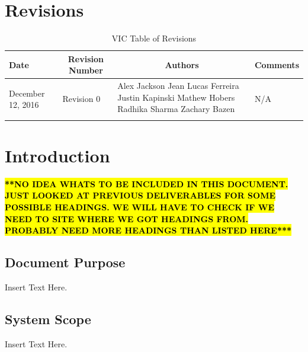 \documentclass [11pt]{article}
\begin{document}
\section{Revisions}
\begin{longtable}{| p{ } | p{ } | p{ } | p{ } |}

\hline 
\centering \textbf{Date} & 
\multicolumn{1}{c}{\textbf {Revision Number}} &
\multicolumn{1}{|c}{\textbf {Authors}} & 
\multicolumn{1}{|c|}{\textbf {Comments}} \\ \hline

\multirow{4}{*}{\centering December 12, 2016}  & 
\multirow{4}{*}{Revision 0}& 
{Alex Jackson \newline
Jean Lucas Ferreira \newline
Justin Kapinski\newline
Mathew Hobers\newline
Radhika Sharma\newline
Zachary Bazen}
&
 \multirow{4}{*}{N/A} \\ 
\hline 

\caption{VIC Table of Revisions} 
\end{longtable}
\pagebreak


\section {Introduction}
\begin{center}
	\hl{\textbf{\large***NO IDEA WHATS TO BE INCLUDED IN THIS DOCUMENT. JUST LOOKED AT PREVIOUS DELIVERABLES FOR SOME POSSIBLE HEADINGS. WE WILL HAVE TO CHECK IF WE NEED TO SITE WHERE WE GOT HEADINGS FROM. PROBABLY NEED MORE HEADINGS THAN LISTED HERE***}}
\end{center}

\subsection{Document Purpose}
Insert Text Here. 

\subsection{System Scope}
Insert Text Here. 
\end{document}
